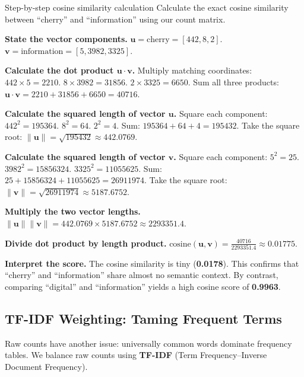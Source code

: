 \documentclass[a4paper,11pt]{article}
\newcommand{\vocab}[1]{\textbf{#1}}
\begin{document}
\begin{worked}{Step-by-step cosine similarity calculation}
Calculate the exact cosine similarity between ``cherry'' and ``information'' using our count matrix.
\begin{steps}
  \item \textbf{State the vector components.}
        $\mathbf{u} = \text{cherry} = [442, 8, 2]$.
        $\mathbf{v} = \text{information} = [5, 3982, 3325]$.
  \item \textbf{Calculate the dot product $\mathbf{u} \cdot \mathbf{v}$.}
        Multiply matching coordinates:
        $442 \times 5 = 2210$.
        $8 \times 3982 = 31856$.
        $2 \times 3325 = 6650$.
        Sum all three products:
        $\mathbf{u} \cdot \mathbf{v} = 2210 + 31856 + 6650 = 40716$.
  \item \textbf{Calculate the squared length of vector $\mathbf{u}$.}
        Square each component:
        $442^2 = 195364$.
        $8^2 = 64$.
        $2^2 = 4$.
        Sum: $195364 + 64 + 4 = 195432$.
        Take the square root: $\|\mathbf{u}\| = \sqrt{195432} \approx 442.0769$.
  \item \textbf{Calculate the squared length of vector $\mathbf{v}$.}
        Square each component:
        $5^2 = 25$.
        $3982^2 = 15856324$.
        $3325^2 = 11055625$.
        Sum: $25 + 15856324 + 11055625 = 26911974$.
        Take the square root: $\|\mathbf{v}\| = \sqrt{26911974} \approx 5187.6752$.
  \item \textbf{Multiply the two vector lengths.}
        $\|\mathbf{u}\| \|\mathbf{v}\| = 442.0769 \times 5187.6752 \approx 2293351.4$.
  \item \textbf{Divide dot product by length product.}
        $\text{cosine}(\mathbf{u}, \mathbf{v}) = \frac{40716}{2293351.4} \approx 0.01775$.
  \item \textbf{Interpret the score.}
        The cosine similarity is tiny (\textbf{0.0178}).
        This confirms that ``cherry'' and ``information'' share almost no semantic context.
        By contrast, comparing ``digital'' and ``information'' yields a high cosine score of \textbf{0.9963}.
\end{steps}
\end{worked}

\subsection{TF-IDF Weighting: Taming Frequent Terms}
Raw counts have another issue: universally common words dominate frequency tables.
We balance raw counts using \vocab{TF-IDF} (Term Frequency--Inverse Document Frequency).
\end{document}

